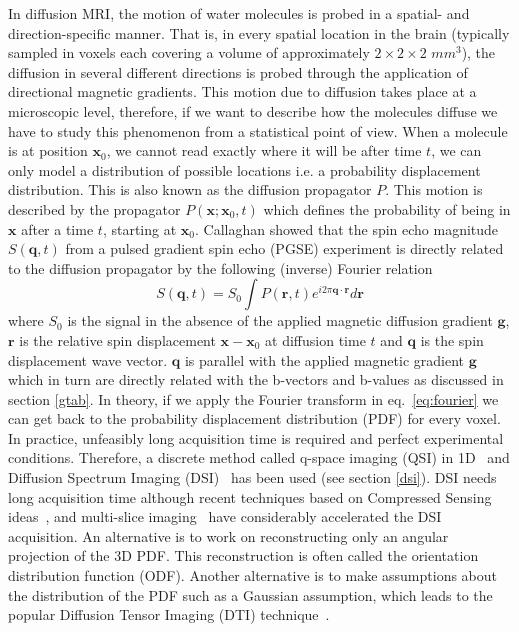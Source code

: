 \documentclass{bioinfo}
\begin{document}
In diffusion MRI, the motion of water molecules is probed in a spatial- and
direction-specific manner. That is, in every spatial location in the brain
(typically sampled in voxels each covering a volume of approximately
$2\times2\times2$ $mm^3$), the diffusion in several different directions is probed
through the application of directional magnetic gradients. This motion due to
diffusion takes
place at a microscopic level, therefore, if we want to describe how the
molecules diffuse we have to study this phenomenon from a statistical
point of view. When a molecule is at position $\mathbf{x}_{0}$, we cannot read
exactly where it will be after time $t$, we can only model a distribution of
possible locations i.e. a probability displacement distribution. This is also
known as the diffusion propagator $P$. This motion is described by the
propagator $P(\mathbf{x};\mathbf{x}_{0},t)$ which defines the probability of
being in $\mathbf{x}$ after a time $t$, starting at $\mathbf{x}_{0}$. Callaghan
\citep{callaghan:91} showed that the spin echo magnitude
$S(\mathbf{q},t)$ from a pulsed gradient spin echo (PGSE) experiment is
directly related to the diffusion propagator by the following (inverse) Fourier
relation
\begin{equation}
S(\mathbf{q},t)=S_{0}\int P(\mathbf{r},t)e^{i2\pi\mathbf{q}\cdot\mathbf{r}}d\mathbf{r}\label{eq:fourier}
\end{equation}
\noindent where $S_{0}$ is the signal in the absence of the applied magnetic
diffusion gradient $\mathbf{g}$, $\mathbf{r}$ is the relative spin displacement
$\mathbf{x}-\mathbf{x}_{0}$ at diffusion time $t$ and $\mathbf{q}$ is the spin
displacement wave vector. $\mathbf{q}$ is parallel with the applied magnetic
gradient $\mathbf{g}$ which in turn are directly related with the b-vectors
and b-values as discussed in section \ref{gtab}.  In theory, if we apply the Fourier
transform in eq.~\ref{eq:fourier} we can get back to the probability
displacement distribution (PDF) for every voxel.
In practice, unfeasibly long acquisition time is
required and perfect experimental conditions. Therefore, a discrete method
called q-space imaging (QSI) in 1D~\citep{callaghan-eccles-etal:1988}
and Diffusion  Spectrum Imaging (DSI)~\citep{wedeen2005mapping} has been used (see section
\ref{dsi}).
DSI needs long acquisition time although recent techniques based on
Compressed Sensing
ideas~\citep{menzel-tan-etal:11,bilgic2012accelerated,gramfort-etal-media:13},
and multi-slice imaging~\citep{Setsompop2012569} have
considerably accelerated the DSI acquisition. An alternative is to
work on reconstructing only an angular projection of the 3D PDF. This
reconstruction is often called the orientation distribution function (ODF).
Another alternative is to make assumptions about the distribution of the PDF
such as a Gaussian assumption, which leads to the popular Diffusion Tensor
Imaging (DTI) technique~\citep{basser-mattiello-etal:94}.
\end{document}
